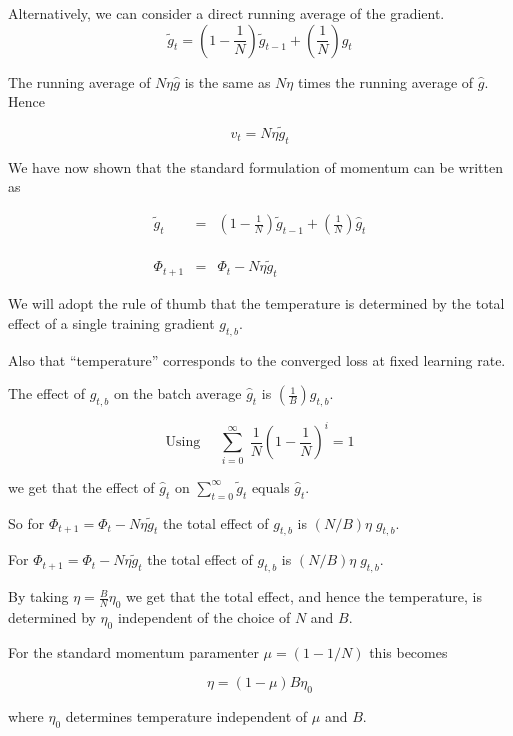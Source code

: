 {\vfill
Alternatively, we can consider a direct running average of the gradient.
{\color{red} $$\tilde{g}_t = \left(1-\frac{1}{N}\right)\tilde{g}_{t-1} + \left(\frac{1}{N}\right) \hat{g}_t$$}

\vfill
The running average of $N\eta\hat{g}$ is the same as $N\eta$ times the running average of $\hat{g}$.  Hence

\vfill
{\color{red} $$v_t = N \eta \tilde{g}_t$$}


We have now shown that the standard formulation of momentum can be written as

\vfill
\begin{eqnarray*}
\tilde{g}_t & = & \left(1-\frac{1}{N}\right)\tilde{g}_{t-1} + \left(\frac{1}{N}\right) \hat{g}_t \\
\\
\\
\\
\Phi_{t+1} & = &  \Phi_t - N\eta\tilde{g}_t
\end{eqnarray*}


We will adopt the rule of thumb that the temperature is determined by the total effect of a single training gradient $g_{t,b}$.


\vfill
Also that ``temperature'' corresponds to the converged loss at fixed learning rate.


The effect of $g_{t,b}$ on the batch average $\hat{g}_t$ is $\left(\frac{1}{B}\right)g_{t,b}$.

\vfill
$$\mathrm{Using}\;\;\;\;\; \sum_{i = 0}^\infty \;\frac{1}{N}\left(1 - \frac{1}{N}\right)^i = 1$$

\vfill
we get that the effect of $\hat{g}_t$ on $\sum_{t=0}^\infty \tilde{g}_t$ equals $\hat{g}_t$.

\vfill
So for $\Phi_{t+1} =  \Phi_t - N\eta\tilde{g}_t$ the total effect of $g_{t,b}$ is $(N/B)\eta\; g_{t,b}$.



For $\Phi_{t+1} =  \Phi_t - N\eta\tilde{g}_t$ the total effect of $g_{t,b}$ is $(N/B)\eta\; g_{t,b}$.

\vfill
By taking $\eta = \frac{B}{N} \eta_0$ we get that the total effect, and hence the temperature, is determined by $\eta_0$ independent of the choice of $N$ and $B$.

\vfill
For the standard momentum paramenter $\mu = (1 - 1/N)$ this becomes

\vfill
{\color{red} $$\eta = (1-\mu)B \eta_0$$}

\vfill
where $\eta_0$ determines temperature independent of $\mu$ and $B$.


} 

